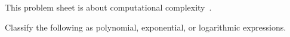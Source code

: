 

\noindent
This problem sheet is about computational complexity~\cite{sipserbook}.

\begin{questions}

\question
Classify the following as polynomial, exponential, or logarithmic expressions.
\begin{solution}
\end{solution}
\end{questions}
